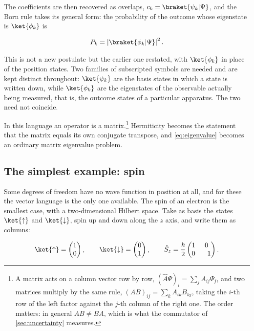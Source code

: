         The coefficients are then recovered as overlaps, $c_{k} = \braket{\psi_{k}|\Psi}$, and the Born rule takes its general form: the probability of the outcome whose eigenstate is $\ket{\phi_{k}}$ is

        \begin{equation}\label{eq:born}
            P_{k} = \left|\braket{\phi_{k}|\Psi}\right|^{2}.
        \end{equation}

        This is not a new postulate but the earlier one restated, with $\ket{\phi_{k}}$ in place of the position states. Two families of subscripted symbols are needed and are kept distinct throughout: $\ket{\psi_{k}}$ are the basis states in which a state is written down, while $\ket{\phi_{k}}$ are the eigenstates of the observable actually being measured, that is, the outcome states of a particular apparatus. The two need not coincide.

        In this language an operator is a matrix.\footnote{A matrix acts on a column vector row by row, $(\hat{A}\Psi)_{i} = \sum_{j}A_{ij}\Psi_{j}$, and two matrices multiply by the same rule, $(AB)_{ij} = \sum_{k}A_{ik}B_{kj}$, taking the $i$-th row of the left factor against the $j$-th column of the right one. The order matters: in general $AB \neq BA$, which is what the commutator of \cref{sec:uncertainty} measures.} Hermiticity becomes the statement that the matrix equals its own conjugate transpose, and \cref{eq:eigenvalue} becomes an ordinary matrix eigenvalue problem.

    \subsection{The simplest example: spin}

        Some degrees of freedom have no wave function in position at all, and for these the vector language is the only one available. The spin of an electron is the smallest case, with a two-dimensional Hilbert space. Take as basis the states $\ket{\uparrow}$ and $\ket{\downarrow}$, spin up and down along the $z$ axis, and write them as columns:

        \begin{equation*}
            \ket{\uparrow} = \begin{pmatrix} 1 \\ 0 \end{pmatrix}, \qquad
            \ket{\downarrow} = \begin{pmatrix} 0 \\ 1 \end{pmatrix}, \qquad
            \hat{S}_{z} = \frac{\hbar}{2}\begin{pmatrix} 1 & 0 \\ 0 & -1 \end{pmatrix}.
        \end{equation*}

